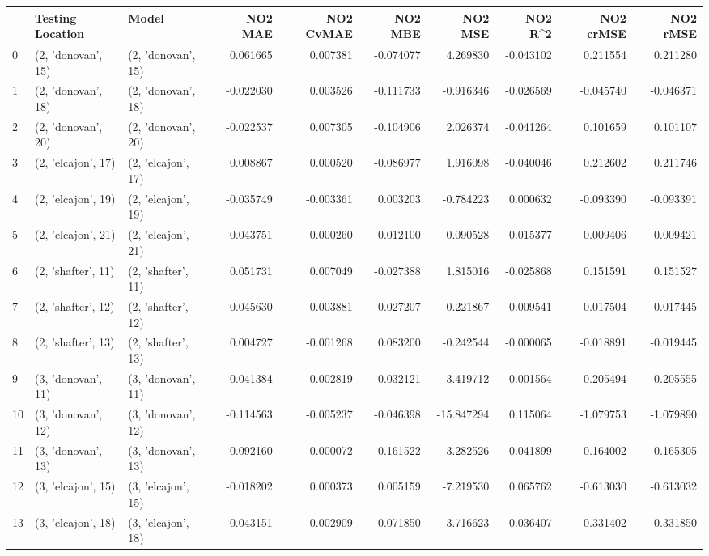 \begin{tabular}{lllrrrrrrr}
\toprule
{} &    Testing Location &               Model &   NO2 MAE &  NO2 CvMAE &   NO2 MBE &    NO2 MSE &   NO2 R\textasciicircum2 &  NO2 crMSE &  NO2 rMSE \\
\midrule
0  &  (2, 'donovan', 15) &  (2, 'donovan', 15) &  0.061665 &   0.007381 & -0.074077 &   4.269830 & -0.043102 &   0.211554 &  0.211280 \\
1  &  (2, 'donovan', 18) &  (2, 'donovan', 18) & -0.022030 &   0.003526 & -0.111733 &  -0.916346 & -0.026569 &  -0.045740 & -0.046371 \\
2  &  (2, 'donovan', 20) &  (2, 'donovan', 20) & -0.022537 &   0.007305 & -0.104906 &   2.026374 & -0.041264 &   0.101659 &  0.101107 \\
3  &  (2, 'elcajon', 17) &  (2, 'elcajon', 17) &  0.008867 &   0.000520 & -0.086977 &   1.916098 & -0.040046 &   0.212602 &  0.211746 \\
4  &  (2, 'elcajon', 19) &  (2, 'elcajon', 19) & -0.035749 &  -0.003361 &  0.003203 &  -0.784223 &  0.000632 &  -0.093390 & -0.093391 \\
5  &  (2, 'elcajon', 21) &  (2, 'elcajon', 21) & -0.043751 &   0.000260 & -0.012100 &  -0.090528 & -0.015377 &  -0.009406 & -0.009421 \\
6  &  (2, 'shafter', 11) &  (2, 'shafter', 11) &  0.051731 &   0.007049 & -0.027388 &   1.815016 & -0.025868 &   0.151591 &  0.151527 \\
7  &  (2, 'shafter', 12) &  (2, 'shafter', 12) & -0.045630 &  -0.003881 &  0.027207 &   0.221867 &  0.009541 &   0.017504 &  0.017445 \\
8  &  (2, 'shafter', 13) &  (2, 'shafter', 13) &  0.004727 &  -0.001268 &  0.083200 &  -0.242544 & -0.000065 &  -0.018891 & -0.019445 \\
9  &  (3, 'donovan', 11) &  (3, 'donovan', 11) & -0.041384 &   0.002819 & -0.032121 &  -3.419712 &  0.001564 &  -0.205494 & -0.205555 \\
10 &  (3, 'donovan', 12) &  (3, 'donovan', 12) & -0.114563 &  -0.005237 & -0.046398 & -15.847294 &  0.115064 &  -1.079753 & -1.079890 \\
11 &  (3, 'donovan', 13) &  (3, 'donovan', 13) & -0.092160 &   0.000072 & -0.161522 &  -3.282526 & -0.041899 &  -0.164002 & -0.165305 \\
12 &  (3, 'elcajon', 15) &  (3, 'elcajon', 15) & -0.018202 &   0.000373 &  0.005159 &  -7.219530 &  0.065762 &  -0.613030 & -0.613032 \\
13 &  (3, 'elcajon', 18) &  (3, 'elcajon', 18) &  0.043151 &   0.002909 & -0.071850 &  -3.716623 &  0.036407 &  -0.331402 & -0.331850 \\

\end{tabular}
